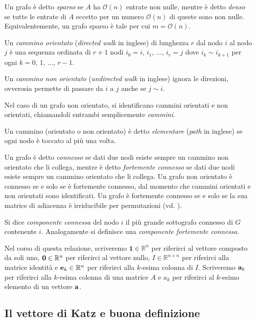 \documentclass[a4paper]{article}
\newcommand{\RR}{\mathbb{R}}
\newcommand{\evec}{{\bf e}}
\newcommand{\avec}{{\bf a}}
\newcommand{\bone}{\mathbf{1}}
\newcommand{\bzero}{{\bf 0}}
\newcommand{\OO}{\mathcal{O}}
\begin{document}
Un grafo è detto \textit{sparso} se $A$ ha $\OO(n)$ entrate non nulle, mentre è detto \textit{denso}
se tutte le entrate di $A$ eccetto per un numero $\OO(n)$ di queste sono non nulle. Equivalentemente, un grafo sparso è tale per cui $m = \OO(n)$.

Un \textit{cammino orientato} (\textit{directed walk} in inglese) di lunghezza $r$ dal nodo $i$ al nodo $j$ è una sequenza
ordinata di $r+1$ nodi $i_0 = i$, $i_1$, ..., $i_r = j$ dove $i_k \sim i_{k+1}$ per ogni $k = 0$, $1$, ..., $r-1$.

Un \textit{cammino non orientato} (\textit{undirected walk} in inglese) ignora le direzioni, ovverosia permette di passare da $i$ a $j$
anche se $j \sim i$.

Nel caso di un grafo non orientato, si identificano cammini orientati
e non orientati, chiamandoli entrambi semplicemente \textit{cammini}.

Un cammino (orientato o non orientato) è detto \textit{elementare} (\textit{path} in inglese) se ogni nodo è toccato al più una volta.

Un grafo è detto \textit{connesso} se dati due nodi esiste sempre un cammino non orientato che li collega, mentre è detto \textit{fortemente connesso} se dati due nodi esiste sempre un cammino
orientato che li collega. Un grafo non orientato è connesso se e solo se è fortemente connesso, dal momento che cammini orientati e non orientati sono
identificati. Un grafo è fortemente connesso se e solo se la sua matrice di adiacenza è
irriducibile per permutazioni (vd. \cite[Theorem 3.2.1]{brualdi1991combinatorial}).

Si dice \textit{componente connessa} del nodo $i$ il più grande sottografo
connesso di $G$ contenente $i$. Analogamente si definisce una \textit{componente fortemente connessa}. 

Nel corso di questa relazione, scriveremo
$\bone \in \RR^n$ per riferirci al vettore composto da soli uno, $\bzero \in \RR^n$ per riferirci al vettore nullo, $I \in \RR^{n \times n}$ per riferirci
alla matrice identità e $\evec_k \in \RR^n$ per riferirci alla $k$-esima colonna di $I$. Scriveremo $\avec_k$ per riferirci alla $k$-esima colonna di una matrice $A$ e $a_k$ per riferirci al $k$-esimo elemento di un vettore $\avec$.

\subsection{Il vettore di Katz e buona definizione}
\end{document}
